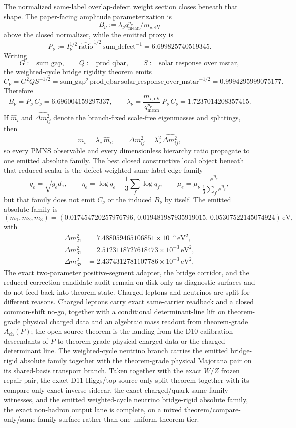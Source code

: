 \documentclass[11pt]{article}
\begin{document}
The normalized same-label overlap-defect weight section closes beneath that shape. The paper-facing amplitude parameterization is
\[
B_\nu:=\lambda_\nu q_{\mathrm{mean}}^{p_\nu}/m_{\star,\mathrm{eV}}
\]
above the closed normalizer, while the emitted proxy is
\[
P_\nu:=I_\nu^{1/2}\,\widehat{\mathrm{ratio}}^{\,1/2}\,\mathrm{sum\_defect}^{-1}=6.699825740519345.
\]
Writing
\[
G:=\mathrm{sum\_gap},
\qquad
Q:=\mathrm{prod\_qbar},
\qquad
S:=\mathrm{solar\_response\_over\_mstar},
\]
the weighted-cycle bridge rigidity theorem emits
\[
C_\nu
=
G^2Q S^{-1/2}
=
\mathrm{sum\_gap}^2\,\mathrm{prod\_qbar}\,\mathrm{solar\_response\_over\_mstar}^{-1/2}
=
0.9994295999075177.
\]
Therefore
\[
B_\nu=P_\nu\,C_\nu=6.696004159297337,
\qquad
\lambda_\nu=\frac{m_{\star,\mathrm{eV}}}{q_{\mathrm{mean}}^{p_\nu}}\,P_\nu\,C_\nu=1.7237014208357415.
\]
If \(\hat m_i\) and \(\widehat{\Delta m_{ij}^2}\) denote the branch-fixed scale-free eigenmasses and splittings, then
\[
m_i=\lambda_\nu\,\hat m_i,
\qquad
\Delta m_{ij}^2=\lambda_\nu^2\,\widehat{\Delta m_{ij}^2},
\]
so every PMNS observable and every dimensionless hierarchy ratio propagate to one emitted absolute family.
The best closed constructive local object beneath that reduced scalar is the defect-weighted same-label edge family
\[
q_e=\sqrt{g_e d_e},
\qquad
\eta_e=\log q_e-\frac13\sum_f \log q_f,
\qquad
\mu_e=\mu_\nu\,\frac{e^{\eta_e}}{\frac13\sum_f e^{\eta_f}},
\]
but that family does not emit \(C_\nu\) or the induced \(B_\nu\) by itself. The emitted absolute family is
\[
(m_1,m_2,m_3)=(0.017454720257976796,\,0.019481987935919015,\,0.05307522145074924)\,\mathrm{eV},
\]
with
\[
\begin{aligned}
\Delta m_{21}^2&=7.488059465106851\times10^{-5}\,\mathrm{eV}^2,\\
\Delta m_{31}^2&=2.5123118727618473\times10^{-3}\,\mathrm{eV}^2,\\
\Delta m_{32}^2&=2.4374312781107786\times10^{-3}\,\mathrm{eV}^2.
\end{aligned}
\]
The exact two-parameter positive-segment adapter, the bridge corridor, and the reduced-correction candidate audit remain on disk only as diagnostic surfaces and do not feed back into theorem state. Charged leptons and neutrinos are split for different reasons. Charged leptons carry exact same-carrier readback and a closed common-shift no-go, together with a conditional determinant-line lift on theorem-grade physical charged data and an algebraic mass readout from theorem-grade \(A_{\mathrm{ch}}(P)\); the open source theorem is the landing from the D10 calibration descendants of \(P\) to theorem-grade physical charged data or the charged determinant line. The weighted-cycle neutrino branch carries the emitted bridge-rigid absolute family together with the theorem-grade physical Majorana pair on its shared-basis transport branch.
Taken together with the exact \(W/Z\) frozen repair pair, the exact D11 Higgs/top source-only split theorem together with its compare-only exact inverse sidecar, the exact charged/quark same-family witnesses, and the emitted weighted-cycle neutrino bridge-rigid absolute family, the exact non-hadron output lane is complete, on a mixed theorem/compare-only/same-family surface rather than one uniform theorem tier.
\end{document}
